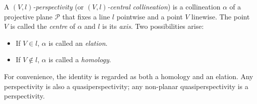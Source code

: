 A \textit{$(V,l)$-perspectivity} (or \textit{$(V,l)$-central collineation}) is a collineation $\alpha$ of a projective plane $\mathcal{P}$ that fixes a line $l$ pointwise and a point $V$ linewise. The point $V$ is called the \textit{centre} of $\alpha$ and $l$ is its \textit{axis}. Two possibilities arise:
\begin{itemize}
\item If $V \in l$, $\alpha$ is called an \textit{elation}.
\item If $V \notin l$, $\alpha$ is called a \textit{homology}.
\end{itemize}
For convenience, the identity is regarded as both a homology and an elation. Any perspectivity is also a quasiperspectivity; any non-planar quasiperspectivity is a perspectivity.
